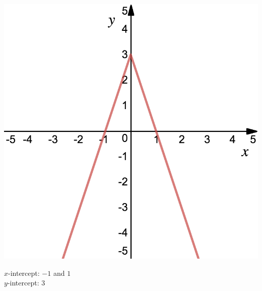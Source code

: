 \vspace{1cm}
\begin{minipage}{0.3\textwidth}%
\includegraphics[width=\linewidth]{pics/ex4.png}
\end{minipage}%
\hfill%
\begin{minipage}{0.6\textwidth}
$x$-intercept: $-1$ and $1$ \\
$y$-intercept: $3$
\end{minipage}


